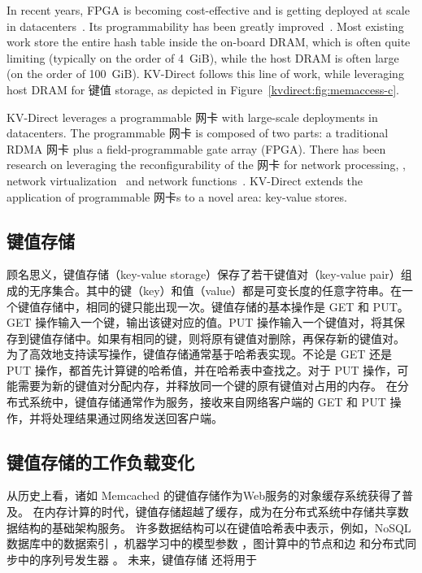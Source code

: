 {In recent years, FPGA is becoming cost-effective and is getting deployed at scale in datacenters~\cite{putnam2014programmable, caulfield2016cloud}. Its programmability has been greatly improved~\cite{li2016clicknp}.
Most existing work store the entire hash table inside the on-board DRAM, which is often quite limiting (typically on the order of 4~GiB), while the host DRAM is often large (on the order of 100~GiB).
KV-Direct follows this line of work, while leveraging host DRAM for 键值 storage, as depicted in Figure~\ref{kvdirect:fig:memaccess-c}.

KV-Direct leverages a programmable 网卡 with large-scale deployments in datacenters.
The programmable 网卡 is composed of two parts: a traditional RDMA 网卡 plus a field-programmable gate array (FPGA).
There has been research on leveraging the reconfigurability of the 网卡 for network processing, \eg, network virtualization~\cite{greenberg2015sdn, vfp} and network functions~\cite{li2016clicknp}.
KV-Direct extends the application of programmable 网卡s to a novel area: key-value stores.
}

\subsection{键值存储}
\label{kvdirect:sec:kvs}

顾名思义，键值存储（key-value storage）保存了若干键值对（key-value pair）组成的无序集合。其中的键（key）和值（value）都是可变长度的任意字符串。在一个键值存储中，相同的键只能出现一次。键值存储的基本操作是 GET 和 PUT。GET 操作输入一个键，输出该键对应的值。PUT 操作输入一个键值对，将其保存到键值存储中。如果有相同的键，则将原有键值对删除，再保存新的键值对。
为了高效地支持读写操作，键值存储通常基于哈希表实现。不论是 GET 还是 PUT 操作，都首先计算键的哈希值，并在哈希表中查找之。对于 PUT 操作，可能需要为新的键值对分配内存，并释放同一个键的原有键值对占用的内存。
在分布式系统中，键值存储通常作为服务，接收来自网络客户端的 GET 和 PUT 操作，并将处理结果通过网络发送回客户端。

\subsection{键值存储的工作负载变化}
\label{kvdirect:sec:workload-shift}

\iffalse
\textbf{讨论 serverless computing 中的 shared storage}
\fi

从历史上看，诸如 Memcached \cite {fitzpatrick2004distributed} 的键值存储作为Web服务的对象缓存系统获得了普及。
在内存计算的时代，键值存储超越了缓存，成为在分布式系统中存储共享数据结构的基础架构服务。
许多数据结构可以在键值哈希表中表示，例如，NoSQL 数据库中的数据索引 \cite {chang2008bigtable}，机器学习中的模型参数 \cite {li2014scaling}，图计算中的节点和边 \cite {shao2013trinity,xiao17tux2} 和分布式同步中的序列号发生器 \cite {kalia2016design,eris}。
未来，键值存储 \cite{jonas2019cloud} 还将用于

